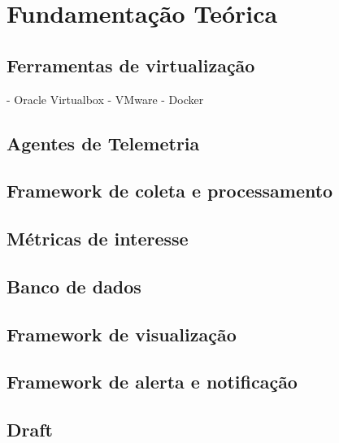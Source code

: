 \chapter{Fundamentação Teórica}
\label{chap2}

\section{Ferramentas de virtualização}
 - Oracle Virtualbox
 - VMware
 - Docker

\section{Agentes de Telemetria}
\section{Framework de coleta e processamento}
\section{Métricas de interesse}
\section{Banco de dados}
\section{Framework de visualização}
\section{Framework de alerta e notificação}

\section{}
\section{Draft}
